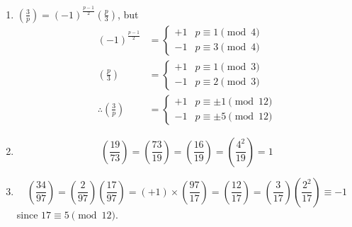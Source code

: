 \documentclass{article}
\newcommand{\legendre}[2]{\genfrac{(}{)}{}{}{#1}{#2}}
\begin{document}
\begin{eg}
    \leavevmode
    \begin{enumerate}[label=(\roman*)]
        \item $\legendre{3}{p} = (-1)^\frac{p-1}{2} \legendre{p}{3}$, but
            \begin{align*}
                (-1)^\frac{p-1}{2} &=
                \begin{cases}
                    +1 & p \equiv 1 \pmod{4} \\
                    -1 & p \equiv 3 \pmod{4}
                \end{cases}
                \\
                \legendre{p}{3} &=
                \begin{cases}
                    +1 & p \equiv 1 \pmod{3} \\
                    -1 & p \equiv 2 \pmod{3}
                \end{cases}
                \\
                \therefore \legendre{3}{p} &=
                \begin{cases}
                    +1 & p \equiv \pm 1 \pmod{12} \\
                    -1 & p \equiv \pm 5 \pmod{12}
                \end{cases}
            \end{align*}
        \item
            \begin{equation*}
                \legendre{19}{73} = \legendre{73}{19} = \legendre{16}{19} = \legendre{4^2}{19} = 1
            \end{equation*}
        \item
            \begin{equation*}
                \legendre{34}{97} = \legendre{2}{97} \legendre{17}{97}
                = (+1) \times \legendre{97}{17}
                = \legendre{12}{17}
                = \legendre{3}{17} \legendre{2^2}{17}
                \equiv -1
            \end{equation*}
            since $17 \equiv 5 \pmod{12}$.
    \end{enumerate}
\end{eg}
\end{document}
